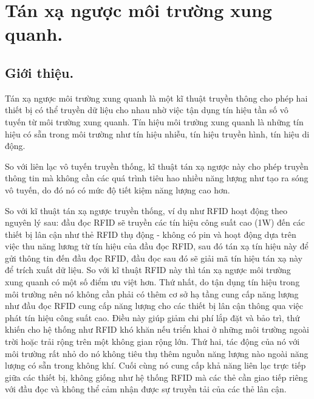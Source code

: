 \documentclass{uetgraduation}
\begin{document}
\section{Tán xạ ngược môi trường xung quanh.}
\subsection{Giới thiệu.}
Tán xạ ngược môi trường xung quanh là một kĩ thuật truyền thông cho phép hai thiết bị có thể truyền dữ liệu cho nhau nhờ việc tận dụng tín hiệu tần số vô tuyến từ môi trường 
xung quanh. Tín hiệu môi trường xung quanh là những tín hiệu có sẵn trong môi trường như tín hiệu nhiễu, tín hiệu truyền hình, tín hiệu di động.

So với liên lạc vô tuyến truyền thống, kĩ thuật tán xạ ngược này cho phép truyền thông tin mà không cần các quá trình tiêu hao nhiều năng lượng như tạo ra sóng vô tuyến, 
do đó nó có mức độ tiết kiệm năng lượng cao hơn. 

So với kĩ thuật tán xạ ngược truyền thống, ví dụ như RFID hoạt động theo nguyên lý sau: đầu đọc RFID sẽ truyền các tín hiệu công suất cao (1W) đến 
các thiết bị lân cận như thẻ RFID thụ động - không có pin và hoạt động dựa trên việc thu năng lương từ tín hiệu của đầu đọc RFID, sau đó tán xạ tín hiệu này để gửi thông tin
đến đầu đọc RFID, đầu đọc sau đó sẽ giải mã tín hiệu tán xạ này để trích xuất dữ liệu. So với kĩ thuật RFID này thì tán xạ ngược môi trường xung quanh có một số điểm ưu việt hơn.
Thứ nhất, do tận dụng tín hiệu trong môi trường nên nó không cần phải có thêm cơ sở hạ tầng cung cấp năng lượng như đầu đọc RFID cung cấp năng lượng cho các thiết bị lân cận 
thông qua việc phát tín hiệu công suất cao. Điều này giúp giảm chi phí lắp đặt và bảo trì, thứ khiến cho hệ thống như RFID khó khăn nếu triển khai ở những môi trường ngoài trời
hoặc trải rộng trên một không gian rộng lớn. Thứ hai, tác động của nó với môi trường rất nhỏ do nó không tiêu thụ thêm nguồn năng lượng nào ngoài năng lượng có sẵn trong không
khí. Cuối cùng nó cung cấp khả năng liên lạc trực tiếp giữa các thiết bị, không giống như hệ thống RFID mà các thẻ cần giao tiếp riêng với đầu đọc và không thể cảm nhận được sự
truyền tải của các thẻ lân cận.
\end{document}
